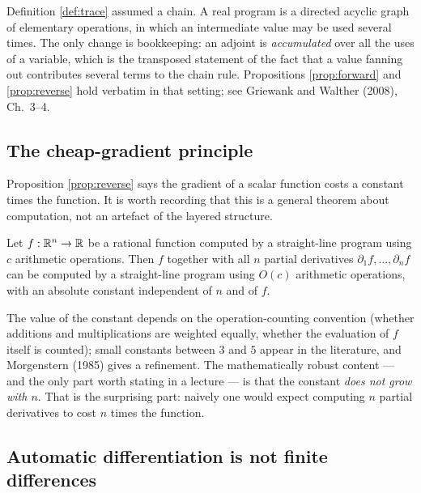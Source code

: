\documentclass[11pt,a4paper]{article}
\begin{document}
\begin{remark}\label{rem:general-graph}
Definition \ref{def:trace} assumed a chain. A real program is a directed acyclic graph of elementary
operations, in which an intermediate value may be used several times. The only change is
bookkeeping: an adjoint is \emph{accumulated} over all the uses of a variable, which is the
transposed statement of the fact that a value fanning out contributes several terms to the chain
rule. Propositions \ref{prop:forward} and \ref{prop:reverse} hold verbatim in that setting; see
Griewank and Walther (2008), Ch.~3--4.
\end{remark}

\subsection{The cheap-gradient principle}

Proposition \ref{prop:reverse} says the gradient of a scalar function costs a constant times the
function. It is worth recording that this is a general theorem about computation, not an artefact of
the layered structure.

\begin{theorem}\label{th:baur}
Let $f : \mathbb{R}^n \to \mathbb{R}$ be a rational function computed by a straight-line program using $c$
arithmetic operations. Then $f$ together with all $n$ partial derivatives
$\partial_1 f, \dots, \partial_n f$ can be computed by a straight-line program using $O(c)$
arithmetic operations, with an absolute constant independent of $n$ and of $f$.
\end{theorem}

\begin{remark}
The value of the constant depends on the operation-counting convention (whether additions and
multiplications are weighted equally, whether the evaluation of $f$ itself is counted); small
constants between $3$ and $5$ appear in the literature, and Morgenstern (1985) gives a refinement.
The mathematically robust content --- and the only part worth stating in a lecture --- is that the
constant \emph{does not grow with $n$}. That is the surprising part: naively one would expect
computing $n$ partial derivatives to cost $n$ times the function.
\end{remark}

\subsection{Automatic differentiation is not finite differences}
\end{document}
